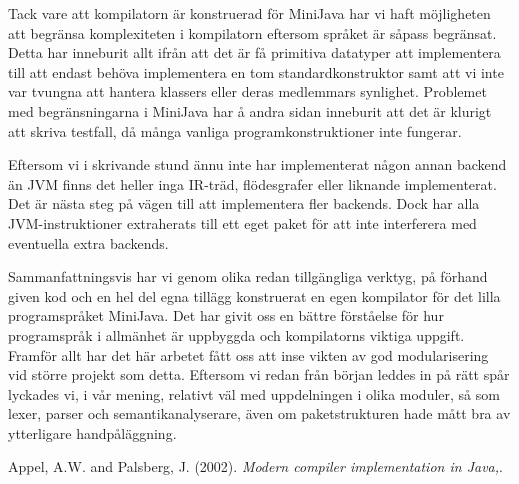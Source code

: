 \documentclass[a4paper,11pt]{article}
\renewcommand{\*}[0]{\cdot}
\begin{document}
Tack vare att kompilatorn är konstruerad för MiniJava har vi haft möjligheten
att begränsa komplexiteten i kompilatorn eftersom språket är såpass begränsat.
Detta har inneburit allt ifrån att det är få primitiva datatyper att
implementera till att endast behöva implementera en tom standardkonstruktor
samt att vi inte var tvungna att hantera klassers eller deras medlemmars
synlighet. Problemet med begränsningarna i MiniJava har å andra sidan inneburit
att det är klurigt att skriva testfall, då många vanliga programkonstruktioner
inte fungerar.

Eftersom vi i skrivande stund ännu inte har implementerat någon annan backend
än JVM finns det heller inga IR-träd, flödesgrafer eller liknande
implementerat. Det är nästa steg på vägen till att implementera fler backends.
Dock har alla JVM-instruktioner extraherats till ett eget paket för att inte
interferera med eventuella extra backends.

Sammanfattningsvis har vi genom olika redan tillgängliga verktyg, på förhand
given kod och en hel del egna tillägg konstruerat en egen kompilator för det
lilla programspråket MiniJava. Det har givit oss en bättre förståelse för hur
programspråk i allmänhet är uppbyggda och kompilatorns viktiga uppgift. Framför
allt har det här arbetet fått oss att inse vikten av god modularisering vid
större projekt som detta. Eftersom vi redan från början leddes in på rätt spår
lyckades vi, i vår mening, relativt väl med uppdelningen i olika moduler, så
som lexer, parser och semantikanalyserare, även om paketstrukturen hade mått
bra av ytterligare handpåläggning.


\begin{thebibliography}{99}

        Appel, A.W. and Palsberg, J.
        (2002).
        \emph{Modern compiler implementation in Java,}.
\end{thebibliography}
\end{document}
